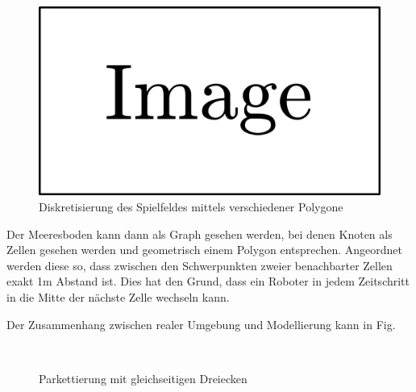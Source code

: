 \documentclass{article}
\begin{document}
\begin{figure}
\includegraphics{img/dummy.png}
\caption{Diskretisierung des Spielfeldes mittels verschiedener Polygone}
\label{img:floor_comp_polygons}
\end{figure}

Der Meeresboden kann dann als Graph gesehen werden, bei denen Knoten 
als Zellen gesehen werden und geometrisch einem Polygon entsprechen. 
Angeordnet werden diese so, dass zwischen den Schwerpunkten zweier 
benachbarter Zellen exakt 1m Abstand ist. Dies hat den Grund, dass 
ein Roboter in jedem Zeitschritt in die Mitte der nächste Zelle wechseln kann.

Der Zusammenhang zwischen realer Umgebung und Modellierung kann in
Fig. 

\begin{figure}[!ht]
  \centering
  \qquad
  \\
  \caption{Parkettierung mit gleichseitigen Dreiecken}
  \label{fig:tess_triangle}
\end{figure}
\end{document}

